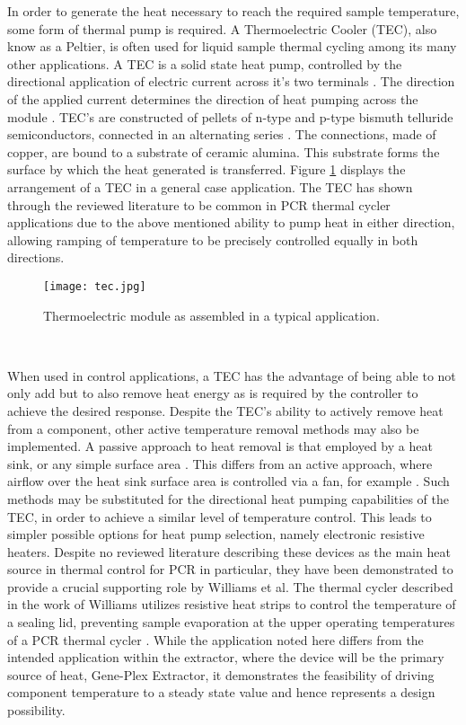 In order to generate the heat necessary to reach the required sample temperature, some form of thermal pump is required. A Thermoelectric Cooler (TEC), also know as a Peltier, is often used for liquid sample thermal cycling \cite{12436620} among its many other applications. A TEC is a solid state heat pump, controlled by the directional application of electric current across it's two terminals \cite{20160801988967}. The direction of the applied current determines the direction of heat pumping across the module \cite{20160801988967}. TEC's are constructed of pellets of n-type and p-type bismuth telluride semiconductors, connected in an alternating series \cite{6464884}. The connections, made of copper, are bound to a substrate of ceramic alumina. This substrate forms the surface by which the heat generated is transferred. Figure \ref{fig:tec} displays the arrangement of a TEC in a general case application. The TEC has shown through the reviewed literature to be common in PCR thermal cycler applications due to the above mentioned ability to pump heat in either direction, allowing ramping of temperature to be precisely controlled equally in both directions.\\

\begin{figure}[!htb]
	\centering
	\texttt{[image: tec.jpg]}
	\caption[Thermoelectric Module Application.]{Thermoelectric module as assembled in a typical application. \cite{Ferrotec}}
	\label{fig:tec}
\end{figure} 
\FloatBarrier

When used in control applications, a TEC has the advantage of being able to not only add but to also remove heat energy as is required by the controller to achieve the desired response. Despite the TEC's ability to actively remove heat from a component, other active temperature removal methods may also be implemented. A passive approach to heat removal is that employed by a heat sink, or any simple surface area \cite{2006289990179}\cite{20144600208116}. This differs from an active approach, where airflow over the heat sink surface area is controlled via a fan, for example \cite{2006289990179}. Such methods may be substituted for the directional heat pumping capabilities of the TEC, in order to achieve a similar level of temperature control. This leads to simpler possible options for heat pump selection, namely electronic resistive heaters. Despite no reviewed literature describing these devices as the main heat source in thermal control for PCR in particular, they have been demonstrated to provide a crucial supporting role by Williams et al. The thermal cycler described in the work of Williams utilizes resistive heat strips to control the temperature of a sealing lid, preventing sample evaporation at the upper operating temperatures of a PCR thermal cycler \cite{7238517}. While the application noted here differs from the intended application within the extractor, where the device will be the primary source of heat, Gene-Plex Extractor, it demonstrates the feasibility of driving component temperature to a steady state value and hence represents a design possibility.\\


